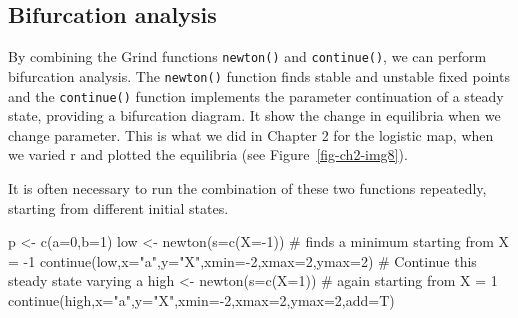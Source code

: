 \documentclass[
  a4paper,
  DIV=11,
  numbers=noendperiod]{scrreprt}
\newenvironment{Shaded}{\begin{snugshade}}{\end{snugshade}}
\newcommand{\AttributeTok}[1]{\textcolor[rgb]{0.40,0.45,0.13}{#1}}
\newcommand{\CommentTok}[1]{\textcolor[rgb]{0.37,0.37,0.37}{#1}}
\newcommand{\DecValTok}[1]{\textcolor[rgb]{0.68,0.00,0.00}{#1}}
\newcommand{\FunctionTok}[1]{\textcolor[rgb]{0.28,0.35,0.67}{#1}}
\newcommand{\NormalTok}[1]{\textcolor[rgb]{0.00,0.23,0.31}{#1}}
\newcommand{\OtherTok}[1]{\textcolor[rgb]{0.00,0.23,0.31}{#1}}
\newcommand{\SpecialCharTok}[1]{\textcolor[rgb]{0.37,0.37,0.37}{#1}}
\newcommand{\StringTok}[1]{\textcolor[rgb]{0.13,0.47,0.30}{#1}}
\begin{document}
\hypertarget{sec-Bifurcation-analysis}{%
\subsection{Bifurcation analysis}\label{sec-Bifurcation-analysis}}

By combining the Grind functions \texttt{newton()} and
\texttt{continue()}, we can perform bifurcation analysis. The
\texttt{newton()} function finds stable and unstable fixed points and
the \texttt{continue()} function implements the parameter continuation
of a steady state, providing a bifurcation diagram. It show the change
in equilibria when we change parameter. This is what we did in Chapter 2
for the logistic map, when we varied r and plotted the equilibria (see
Figure~\ref{fig-ch2-img8}).

It is often necessary to run the combination of these two functions
repeatedly, starting from different initial states.

\begin{Shaded}
\begin{Highlighting}[]
\NormalTok{p }\OtherTok{\textless{}{-}} \FunctionTok{c}\NormalTok{(}\AttributeTok{a=}\DecValTok{0}\NormalTok{,}\AttributeTok{b=}\DecValTok{1}\NormalTok{)}
\NormalTok{low }\OtherTok{\textless{}{-}} \FunctionTok{newton}\NormalTok{(}\AttributeTok{s=}\FunctionTok{c}\NormalTok{(}\AttributeTok{X=}\SpecialCharTok{{-}}\DecValTok{1}\NormalTok{)) }\CommentTok{\# finds a minimum starting from X = {-}1}
\FunctionTok{continue}\NormalTok{(low,}\AttributeTok{x=}\StringTok{"a"}\NormalTok{,}\AttributeTok{y=}\StringTok{"X"}\NormalTok{,}\AttributeTok{xmin=}\SpecialCharTok{{-}}\DecValTok{2}\NormalTok{,}\AttributeTok{xmax=}\DecValTok{2}\NormalTok{,}\AttributeTok{ymax=}\DecValTok{2}\NormalTok{) }\CommentTok{\# Continue this steady state varying a}
\NormalTok{high }\OtherTok{\textless{}{-}} \FunctionTok{newton}\NormalTok{(}\AttributeTok{s=}\FunctionTok{c}\NormalTok{(}\AttributeTok{X=}\DecValTok{1}\NormalTok{)) }\CommentTok{\# again starting from X = 1}
\FunctionTok{continue}\NormalTok{(high,}\AttributeTok{x=}\StringTok{"a"}\NormalTok{,}\AttributeTok{y=}\StringTok{"X"}\NormalTok{,}\AttributeTok{xmin=}\SpecialCharTok{{-}}\DecValTok{2}\NormalTok{,}\AttributeTok{xmax=}\DecValTok{2}\NormalTok{,}\AttributeTok{ymax=}\DecValTok{2}\NormalTok{,}\AttributeTok{add=}\NormalTok{T)}
\end{Highlighting}
\end{Shaded}
\end{document}

